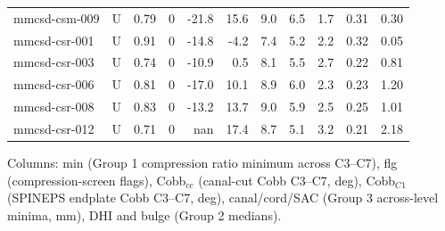 \begin{center}
\begin{longtable}{l l r r r r r r r r r}
mmcsd-csm-009 & U & 0.79 & 0 & -21.8 & 15.6 & 9.0 & 6.5 & 1.7 & 0.31 & 0.30 \\
mmcsd-csr-001 & U & 0.91 & 0 & -14.8 & -4.2 & 7.4 & 5.2 & 2.2 & 0.32 & 0.05 \\
mmcsd-csr-003 & U & 0.74 & 0 & -10.9 & 0.5 & 8.1 & 5.5 & 2.7 & 0.22 & 0.81 \\
mmcsd-csr-006 & U & 0.81 & 0 & -17.0 & 10.1 & 8.9 & 6.0 & 2.3 & 0.23 & 1.20 \\
mmcsd-csr-008 & U & 0.83 & 0 & -13.2 & 13.7 & 9.0 & 5.9 & 2.5 & 0.25 & 1.01 \\
mmcsd-csr-012 & U & 0.71 & 0 & nan & 17.4 & 8.7 & 5.1 & 3.2 & 0.21 & 2.18 \\
\bottomrule
\end{longtable}
\end{center}
Columns: \hahp{} min (Group 1 compression ratio minimum across C3--C7), flg (compression-screen flags), Cobb$_{cc}$ (canal-cut Cobb C3--C7, deg), Cobb$_{C1}$ (SPINEPS endplate Cobb C3--C7, deg), canal/cord/SAC (Group 3 across-level minima, mm), DHI and bulge (Group 2 medians).
